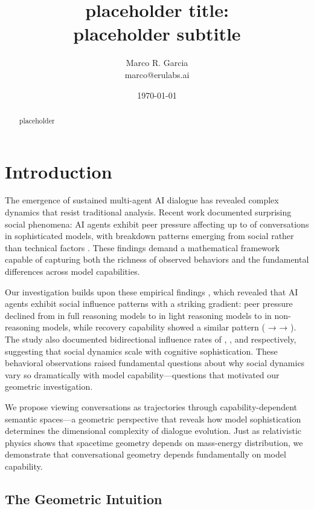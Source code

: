 \documentclass[11pt,letterpaper]{article}
\title{placeholder title: \\
\large placeholder subtitle}
\author{
Marco R. Garcia \\
marco@erulabs.ai
}
\date{\today}
\begin{document}
\maketitle

\begin{abstract}
placeholder
\end{abstract}

\section{Introduction}

The emergence of sustained multi-agent AI dialogue has revealed complex dynamics that resist traditional analysis. Recent work documented surprising social phenomena: AI agents exhibit peer pressure affecting up to \fullReasoningPeerPressure{} of conversations in sophisticated models, with breakdown patterns emerging from social rather than technical factors \citep{garcia2025peer}. These findings demand a mathematical framework capable of capturing both the richness of observed behaviors and the fundamental differences across model capabilities.

Our investigation builds upon these empirical findings \citep{garcia2025peer}, which revealed that AI agents exhibit social influence patterns with a striking gradient: peer pressure declined from \fullReasoningPeerPressure{} in full reasoning models to \lightReasoningPeerPressure{} in light reasoning models to \nonReasoningPeerPressure{} in non-reasoning models, while recovery capability showed a similar pattern (\fullReasoningRecovery{} → \lightReasoningRecovery{} → \nonReasoningRecovery{}). The study also documented bidirectional influence rates of \fullBidirectional{}, \lightBidirectional{}, and \nonBidirectional{} respectively, suggesting that social dynamics scale with cognitive sophistication. These behavioral observations raised fundamental questions about why social dynamics vary so dramatically with model capability—questions that motivated our geometric investigation.

We propose viewing conversations as trajectories through capability-dependent semantic spaces—a geometric perspective that reveals how model sophistication determines the dimensional complexity of dialogue evolution. Just as relativistic physics shows that spacetime geometry depends on mass-energy distribution, we demonstrate that conversational geometry depends fundamentally on model capability.


\subsection{The Geometric Intuition}
\end{document}
